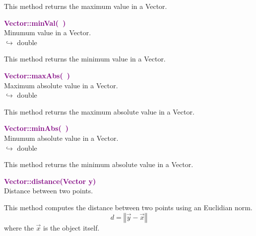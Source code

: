 This method returns the maximum value in a Vector.

\textcolor{purple}{\textbf{Vector::minVal(~)}}\label{Vector::minVal()}\\
Minumum value in a Vector.\\ \hspace*{10mm}$\hookrightarrow$ double

This method returns the minimum value in a Vector.

\textcolor{purple}{\textbf{Vector::maxAbs(~)}}\label{Vector::maxAbs()}\\
Maximum absolute value in a Vector.\\ \hspace*{10mm}$\hookrightarrow$ double

This method returns the maximum absolute value in a Vector.

\textcolor{purple}{\textbf{Vector::minAbs(~)}}\label{Vector::minAbs()}\\
Minumum absolute value in a Vector.\\ \hspace*{10mm}$\hookrightarrow$ double

This method returns the minimum absolute value in a Vector.

\textcolor{purple}{\textbf{Vector::distance(Vector y)}}\label{Vector::distance(Vector y)}\\
Distance between two points.

This method computes the distance between two points using an Euclidian norm.
\begin{equation*}
d = \left\Vert \overrightarrow{y} - \overrightarrow{x} \right\Vert
\end{equation*}
where the $\overrightarrow{x}$ is the object itself.

